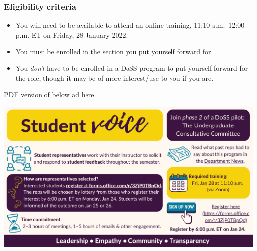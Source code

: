 \documentclass[
  openany]{book}
\begin{document}
\hypertarget{eligibility-criteria}{%
\subsubsection{Eligibility criteria}\label{eligibility-criteria}}

\begin{itemize}
\item
  You will need to be available to attend an online training, 11:10 a.m.--12:00 p.m. ET on Friday, 28 January 2022.
\item
  You must be enrolled in the section you put yourself forward for.
\item
  You \emph{don't} have to be enrolled in a DoSS program to put yourself forward for the role, though it may be of more interest/use to you if you are.
\end{itemize}

PDF version of below ad \href{https://sta303-bolton.github.io/sta303-w22-courseguide/other-files/student-rep-ad-w22.pdf}{here}.

\includegraphics{images/Student Rep Ad (Winter 2022).png}
\end{document}
